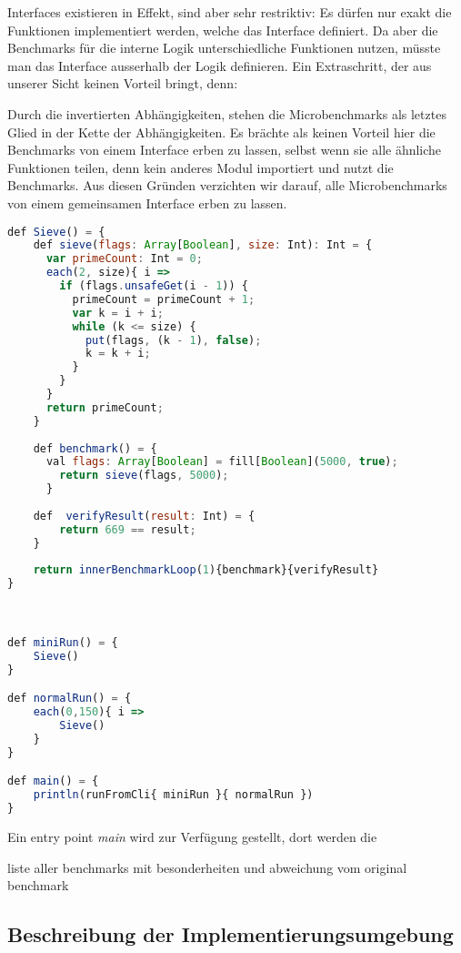 Interfaces existieren in Effekt, sind aber sehr restriktiv: Es dürfen nur exakt die Funktionen implementiert werden, welche das Interface definiert. Da aber die Benchmarks für die interne Logik unterschiedliche Funktionen nutzen, müsste man das Interface ausserhalb der Logik definieren. Ein Extraschritt, der aus unserer Sicht keinen Vorteil bringt, denn:

Durch die invertierten Abhängigkeiten, stehen die Microbenchmarks als letztes Glied in der Kette der Abhängigkeiten. Es brächte als keinen Vorteil hier die Benchmarks von einem Interface erben zu lassen, selbst wenn sie alle ähnliche Funktionen teilen, denn kein anderes Modul importiert und nutzt die Benchmarks. 
Aus diesen Gründen verzichten wir darauf, alle Microbenchmarks von einem gemeinsamen Interface erben zu lassen.


\begin{lstlisting}[language=javascript]
def Sieve() = {
    def sieve(flags: Array[Boolean], size: Int): Int = {
      var primeCount: Int = 0;
      each(2, size){ i =>
        if (flags.unsafeGet(i - 1)) {
          primeCount = primeCount + 1;
          var k = i + i;
          while (k <= size) {
            put(flags, (k - 1), false);
            k = k + i;
          }
        }
      }
      return primeCount;
    }
  
    def benchmark() = {
      val flags: Array[Boolean] = fill[Boolean](5000, true);
        return sieve(flags, 5000);
      }
  
    def  verifyResult(result: Int) = {
        return 669 == result;
    }
  
    return innerBenchmarkLoop(1){benchmark}{verifyResult}
}



def miniRun() = {
    Sieve()
}

def normalRun() = {
    each(0,150){ i =>
        Sieve()
    }
}

def main() = {
    println(runFromCli{ miniRun }{ normalRun })
}
\end{lstlisting}

\subsubsubsection{}

Ein entry point \textit{main\(\)} wird zur Verfügung gestellt, dort werden die 


liste aller benchmarks mit besonderheiten und abweichung vom original benchmark


\subsection{Beschreibung der Implementierungsumgebung}

